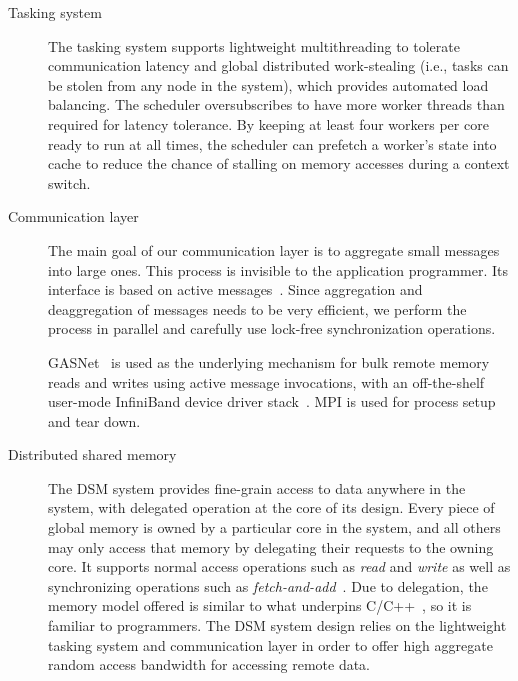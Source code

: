 \begin{description}

\item [Tasking system] The tasking system supports lightweight multithreading
to tolerate communication latency and global distributed work-stealing (i.e.,
tasks can be stolen from any node in the system), which provides automated
load balancing. The scheduler oversubscribes to have more worker threads than
required for latency tolerance. By keeping at least four workers per 
core ready to run at all times, the scheduler can prefetch a worker's state
into cache to reduce the chance of stalling on memory accesses during a
context switch.

\item[Communication layer] The main goal of our communication layer is to
aggregate small messages into large ones. This process is invisible to the
application programmer. Its interface is based on active
messages~\cite{vonEicken92}. Since aggregation and deaggregation of messages
needs to be very efficient, we perform the process in parallel and carefully
use lock-free synchronization operations. 

GASNet~\cite{gasnet} is used as the
underlying mechanism for bulk remote memory reads and writes using active message
invocations, with an off-the-shelf user-mode InfiniBand device driver
stack~\cite{OFED}. MPI is used for process setup and tear down.


\item[Distributed shared memory] The DSM system provides fine-grain access to
data anywhere in the system, with delegated operation at the core of its design.
Every piece of global memory is owned by a particular core in the system, and all others may only access that memory by delegating their requests to the owning core.
It supports normal access operations such as
\emph{read\/} and \emph{write\/} as well as synchronizing operations such as
\emph{fetch-and-add\/}~\cite{fetchandadd}. Due to delegation, the memory model offered is similar to what underpins
C/C++~\cite{N2480,N2800}, so it is familiar to programmers. The DSM system
design relies on the lightweight tasking system and communication layer in
order to offer high aggregate random access bandwidth for accessing remote
data.

\end{description}

